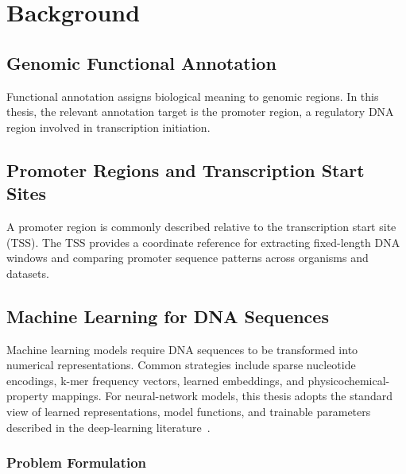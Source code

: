 \chapter{Background}\label{chap:background}

\section{Genomic Functional Annotation}\label{sec:bg-functional-annotation}

Functional annotation assigns biological meaning to genomic regions. In this
thesis, the relevant annotation target is the promoter region, a regulatory DNA
region involved in transcription initiation.

\section{Promoter Regions and Transcription Start Sites}\label{sec:bg-promoters}

A promoter region is commonly described relative to the transcription start site
(TSS). The TSS provides a coordinate reference for extracting fixed-length DNA
windows and comparing promoter sequence patterns across organisms and datasets.

\section{Machine Learning for DNA Sequences}\label{sec:bg-ml-dna}

Machine learning models require DNA sequences to be transformed into numerical
representations. Common strategies include sparse nucleotide encodings, k-mer
frequency vectors, learned embeddings, and physicochemical-property mappings.
For neural-network models, this thesis adopts the standard view of learned
representations, model functions, and trainable parameters described in the
deep-learning literature~\citep{goodfellow2016deep}.

\subsection{Problem Formulation}\label{sec:bg-formulation}

